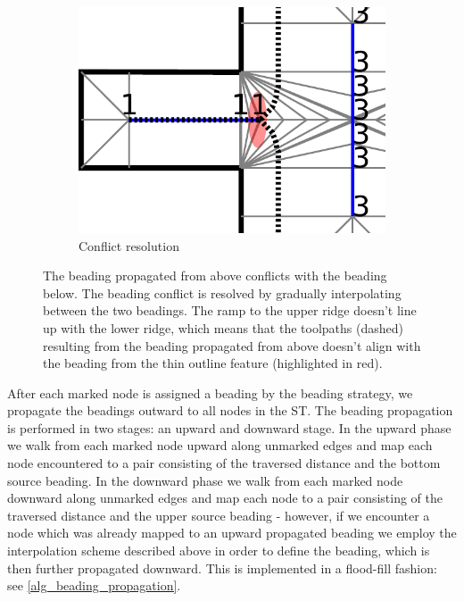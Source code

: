 \begin{figure}
\begin{subfigure}{.45\columnwidth}
\includegraphics[height=\figheight]{sources/method/beading_conflict_solved.pdf}
\caption{Conflict resolution}\label{beading_conflict_solved}
\end{subfigure}
\caption{
 The beading propagated from above conflicts with the beading below.
 The beading conflict is resolved by gradually interpolating between the two beadings.
The ramp to the upper ridge doesn't line up with the lower ridge, which means that
the toolpaths (dashed) resulting from the beading propagated from above doesn't align with the beading from the thin outline feature (highlighted in red).
}
\label{beading_conflict_problem}
\end{figure}

After each marked node is assigned a beading by the beading strategy, we propagate the beadings outward to all nodes in the ST.
The beading propagation is performed in two stages: an upward and downward stage.
In the upward phase we walk from each marked node upward along unmarked edges and map each node encountered to a pair consisting of the traversed distance and the bottom source beading.
In the downward phase we walk from each marked node downward along unmarked edges and map each node to a pair consisting of the traversed distance and the upper source beading -
however, if we encounter a node which was already mapped to an upward propagated beading we employ the interpolation scheme described above in order to define the beading, which is then further propagated downward.
This is implemented in a flood-fill fashion: see \cref{alg_beading_propagation}.

